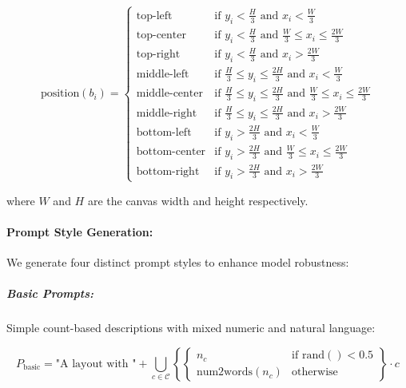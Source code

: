 \documentclass[journal,article,submit,pdftex,moreauthors]{Definitions/mdpi}
\begin{document}
\begin{linenomath}
\begin{equation}
\text{position}(b_i) = \begin{cases}
\text{top-left} & \text{if } y_i < \frac{H}{3} \text{ and } x_i < \frac{W}{3}\\
\text{top-center} & \text{if } y_i < \frac{H}{3} \text{ and } \frac{W}{3} \leq x_i \leq \frac{2W}{3}\\
\text{top-right} & \text{if } y_i < \frac{H}{3} \text{ and } x_i > \frac{2W}{3}\\
\text{middle-left} & \text{if } \frac{H}{3} \leq y_i \leq \frac{2H}{3} \text{ and } x_i < \frac{W}{3}\\
\text{middle-center} & \text{if } \frac{H}{3} \leq y_i \leq \frac{2H}{3} \text{ and } \frac{W}{3} \leq x_i \leq \frac{2W}{3}\\
\text{middle-right} & \text{if } \frac{H}{3} \leq y_i \leq \frac{2H}{3} \text{ and } x_i > \frac{2W}{3}\\
\text{bottom-left} & \text{if } y_i > \frac{2H}{3} \text{ and } x_i < \frac{W}{3}\\
\text{bottom-center} & \text{if } y_i > \frac{2H}{3} \text{ and } \frac{W}{3} \leq x_i \leq \frac{2W}{3}\\
\text{bottom-right} & \text{if } y_i > \frac{2H}{3} \text{ and } x_i > \frac{2W}{3}
\end{cases}
\end{equation}
\end{linenomath}

where $W$ and $H$ are the canvas width and height respectively.

\paragraph{Prompt Style Generation:}

We generate four distinct prompt styles to enhance model robustness:

\subparagraph{Basic Prompts:}
Simple count-based descriptions with mixed numeric and natural language:
\begin{linenomath}
\begin{equation}
P_{\text{basic}} = \text{"A layout with "} + \bigcup_{c \in \mathcal{C}} \left\{ \begin{cases}
n_c & \text{if } \text{rand}() < 0.5\\
\text{num2words}(n_c) & \text{otherwise}
\end{cases} \right\} \cdot c
\end{equation}
\end{linenomath}
\end{document}
